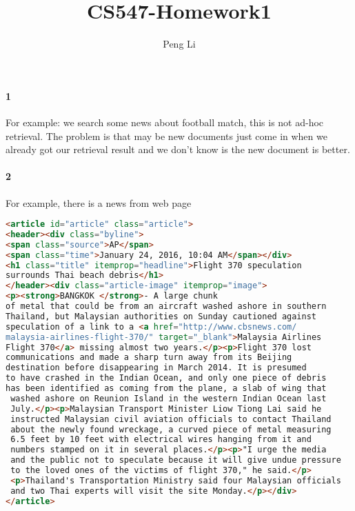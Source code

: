 \documentclass{article}
\author{Peng Li}
\title{CS547-Homework1}
\begin{document}
		\maketitle
		\paragraph{1} For example: we search some news about football match, this is not ad-hoc retrieval. The problem is that may be new documents just come in when we already got our retrieval result and we don’t know is the new document is better.
		\paragraph{2} For example, there is a news from web page \\
		\begin{lstlisting}[language=html]
<article id="article" class="article">
<header><div class="byline">
<span class="source">AP</span>
<span class="time">January 24, 2016, 10:04 AM</span></div>
<h1 class="title" itemprop="headline">Flight 370 speculation 
surrounds Thai beach debris</h1>
</header><div class="article-image" itemprop="image">
<p><strong>BANGKOK </strong>- A large chunk 
of metal that could be from an aircraft washed ashore in southern 
Thailand, but Malaysian authorities on Sunday cautioned against 
speculation of a link to a <a href="http://www.cbsnews.com/
malaysia-airlines-flight-370/" target="_blank">Malaysia Airlines 
Flight 370</a> missing almost two years.</p><p>Flight 370 lost 
communications and made a sharp turn away from its Beijing 
destination before disappearing in March 2014. It is presumed 
to have crashed in the Indian Ocean, and only one piece of debris 
has been identified as coming from the plane, a slab of wing that
 washed ashore on Reunion Island in the western Indian Ocean last 
 July.</p><p>Malaysian Transport Minister Liow Tiong Lai said he 
 instructed Malaysian civil aviation officials to contact Thailand 
 about the newly found wreckage, a curved piece of metal measuring 
 6.5 feet by 10 feet with electrical wires hanging from it and  
 numbers stamped on it in several places.</p><p>"I urge the media 
 and the public not to speculate because it will give undue pressure 
 to the loved ones of the victims of flight 370," he said.</p>
 <p>Thailand's Transportation Ministry said four Malaysian officials 
 and two Thai experts will visit the site Monday.</p></div>
</article>
		\end{lstlisting}
		
\end{document}
